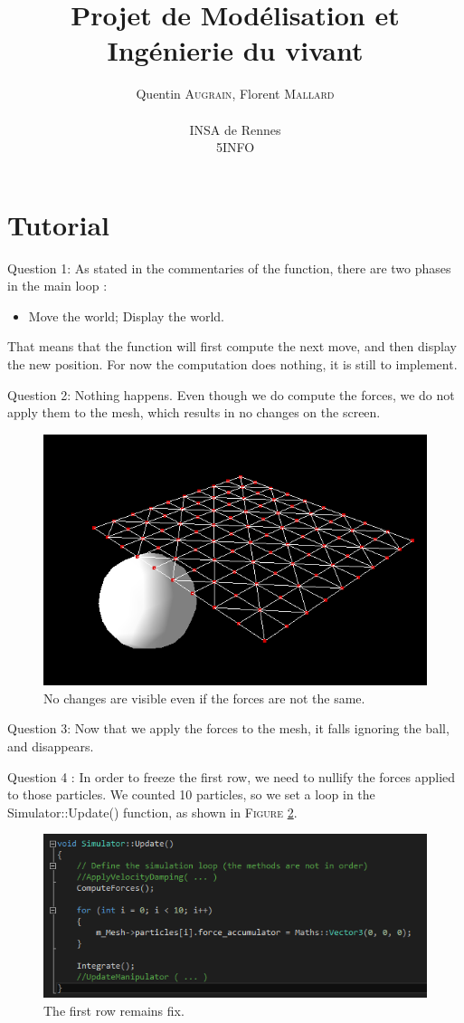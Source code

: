 \documentclass[a4paper,12pt]{article}
\author{
  Quentin \textsc{Augrain}, Florent \textsc{Mallard} \\ \\
  INSA de Rennes \\
  5INFO
}
\title{Projet de Modélisation et Ingénierie du vivant}
\begin{document}
\maketitle

\section{Tutorial}

Question 1: As stated in the commentaries of the function, there are two phases in the main loop :
\begin{itemize}
    \item Move the world;
    \itme Display the world.
\end{itemize}

That means that the function will first compute the next move, and then display the new position. For now the computation does nothing, it is still to implement.

Question 2: Nothing happens. Even though we do compute the forces, we do not apply them to the mesh, which results in no changes on the screen.
\begin{figure}
  \centering
  \includegraphics{q2.png}
  \caption{No changes are visible even if the forces are not the same.}
  \label{fig:q2}
\end{figure}

Question 3: Now that we apply the forces to the mesh, it falls ignoring the ball, and disappears.

Question 4 : In order to freeze the first row, we need to nullify the forces applied to those particles. We counted 10 particles, so we set a loop in the Simulator::Update() function, as shown in \textsc{Figure} \ref{fig:q4}.
\begin{figure}
  \centering
  \includegraphics{q4.png}
  \caption{The first row remains fix.}
  \label{fig:q4}
\end{figure}
\end{document}

